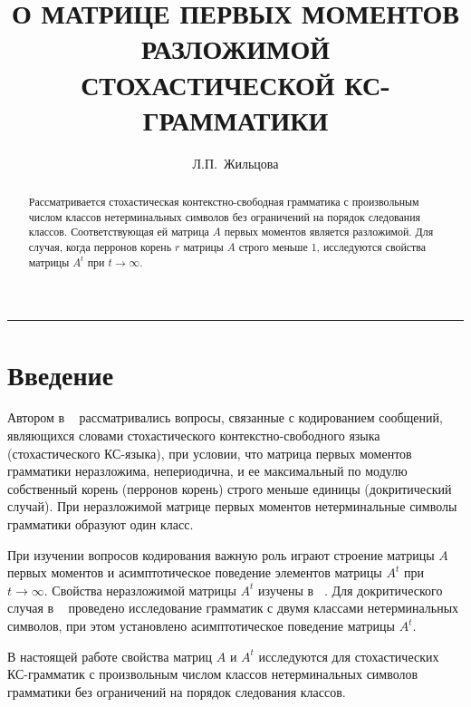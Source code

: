 \documentclass[10pt]{article}
\begin{document}
	
\newtheorem{Theorem}{Теорема}

\renewcommand{\refname}{\small {Литература}}
\renewcommand{\abstractname}{Аннотация}
\renewcommand{\figurename}{Рис.}
\renewcommand{\proofname}{ {\hskip\parindent \bf Доказательство. }}

\title{О МАТРИЦЕ ПЕРВЫХ МОМЕНТОВ РАЗЛОЖИМОЙ \\
СТОХАСТИЧЕСКОЙ КС-ГРАММАТИКИ }

\author{Л.П.~Жильцова}

\maketitle

\begin{abstract}
Рассматривается стохастическая контекстно-свободная грамматика с произвольным числом классов нетерминальных символов без ограничений на порядок следования классов.  Соответствующая ей матрица $A$ первых моментов является разложимой. Для случая, когда перронов корень $r$ матрицы $A$ строго меньше 1, исследуются свойства матрицы $A^t$ при $t \rightarrow \infty.$
\end{abstract}

\vspace{\baselineskip}\hrule


\section{Введение}
Автором в ~\cite{zhilbib1,zhilbib2} рассматривались вопросы, связанные с кодированием сообщений, являющихся словами стохастического контекстно-свободного языка (стохастического КС-языка), при условии, что матрица первых моментов грамматики неразложима, непериодична, и ее максимальный по модулю собственный корень (перронов корень) строго меньше единицы (докритический случай). При неразложимой матрице первых моментов нетерминальные символы грамматики образуют один класс. 

При изучении вопросов кодирования важную роль играют строение матрицы $A$ первых моментов и асимптотическое поведение элементов матрицы $A^t$ при $t \rightarrow \infty.$ Свойства неразложимой матрицы $A^t$ изучены в ~\cite{zhilbib3}. Для докритического случая в ~\cite{zhilbib4} проведено исследование грамматик с двумя классами нетерминальных символов, при этом установлено асимптотическое поведение матрицы $A^t.$

В настоящей работе свойства матриц $A$ и $A^t$ исследуются для стохастических КС-грамматик с произвольным числом классов нетерминальных символов грамматики без ограничений на порядок следования классов.
\end{document}
